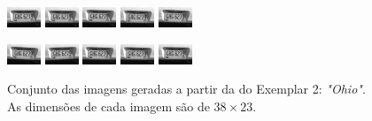 \begin{figure}[H]
	\centering
	\caption{ Conjunto das imagens geradas a partir da do Exemplar 2: \emph{"Ohio"}.
	As dimensões de cada imagem são de $38 \times 23$.}
	\label{fig:frames2}	
	\includegraphics[width=.15\textwidth]{figures/degradedImg2/result-0.png}
	\includegraphics[width=.15\textwidth]{figures/degradedImg2/result-1.png}
	\includegraphics[width=.15\textwidth]{figures/degradedImg2/result-2.png}
	\includegraphics[width=.15\textwidth]{figures/degradedImg2/result-3.png}
	\includegraphics[width=.15\textwidth]{figures/degradedImg2/result-4.png}

	\includegraphics[width=.15\textwidth]{figures/degradedImg2/result-5.png}
	\includegraphics[width=.15\textwidth]{figures/degradedImg2/result-6.png}
	\includegraphics[width=.15\textwidth]{figures/degradedImg2/result-7.png}
	\includegraphics[width=.15\textwidth]{figures/degradedImg2/result-8.png}
	\includegraphics[width=.15\textwidth]{figures/degradedImg2/result-9.png} 


\end{figure}
